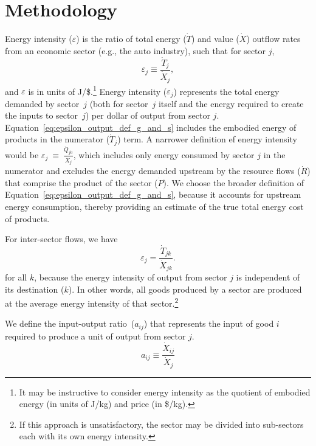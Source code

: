 \section{Methodology}

Energy intensity ($\varepsilon$)
is the ratio 
of total energy ($\dot{T}$) 
and value ($\dot{X}$) outflow rates 
from an economic sector (e.g., the auto industry), 
such that for sector $j$,
%
\begin{equation} \label{eq:epsilon_output_def_g_and_s}
	\varepsilon_{j} \equiv \frac{\dot{T}_{j}}{\dot{X}_{j}},
\end{equation} 
%
and $\varepsilon$ is in units of J/\$.\footnote{It may be
instructive to consider energy intensity as the quotient
of embodied energy (in units of J/kg) and price (in \$/kg).}
Energy intensity ($\varepsilon_j$) represents the total energy demanded
by sector~$j$ (both for sector~$j$ itself and the energy required to
create the inputs to sector~$j$) per dollar of output from sector $j$.
Equation~\ref{eq:epsilon_output_def_g_and_s}
includes the embodied energy of products in the numerator ($\dot{T}_{j}$) term. 
A narrower definition ef energy intensity would be 
$\varepsilon_{j}~\equiv~\frac{\dot{Q}_{j0}}{\dot{X}_{j}}$,
which includes only energy consumed by sector $j$
in the numerator
and excludes the energy demanded upstream by the 
resource flows ($\dot{R}$) that comprise the product of the sector ($\dot{P}$).
We choose the broader definition of
Equation~\ref{eq:epsilon_output_def_g_and_s},
because it accounts for upstream energy consumption,
thereby providing an estimate of the true total energy cost of products.

For inter-sector flows, we have
%
\begin{equation} \label{eq:epsilon_transfers_1}
	\varepsilon_{j} = \frac{\dot{T}_{jk}}{\dot{X}_{jk}}.
\end{equation}
%
for all $k$, because the energy intensity 
of output from sector $j$ is independent of its destination ($k$). 
In other words, all goods produced by a sector 
are produced at the average energy intensity 
of that sector.\footnote{If this approach is unsatisfactory, 
the sector may be divided into sub-sectors 
each with its own energy intensity.}

We define the input-output ratio~($a_{ij}$)
that represents the input 
of good $i$ required to produce a unit of output from sector $j$.
%
\begin{equation} \label{eq:aij_def}
	a_{ij} \equiv \frac{\dot{X}_{ij}}{\dot{X}_{j}}
\end{equation}

